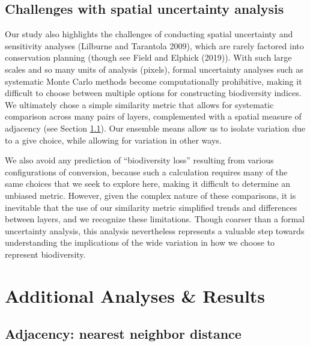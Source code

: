 \documentclass[
]{article}
\begin{document}
\hypertarget{challenges-with-spatial-uncertainty-analysis}{%
\subsection{Challenges with spatial uncertainty analysis}\label{challenges-with-spatial-uncertainty-analysis}}

Our study also highlights the challenges of conducting spatial uncertainty and sensitivity analyses (Lilburne and Tarantola 2009), which are rarely factored into conservation planning (though see Field and Elphick (2019)). With such large scales and so many units of analysis (pixels), formal uncertainty analyses such as systematic Monte Carlo methods become computationally prohibitive, making it difficult to choose between multiple options for constructing biodiversity indices. We ultimately chose a simple similarity metric that allows for systematic comparison across many pairs of layers, complemented with a spatial measure of adjacency (see Section \ref{section-adjacency}). Our ensemble means allow us to isolate variation due to a give choice, while allowing for variation in other ways.

We also avoid any prediction of ``biodiversity loss'' resulting from various configurations of conversion, because such a calculation requires many of the same choices that we seek to explore here, making it difficult to determine an unbiased metric. However, given the complex nature of these comparisons, it is inevitable that the use of our similarity metric simplified trends and differences between layers, and we recognize these limitations. Though coarser than a formal uncertainty analysis, this analysis nevertheless represents a valuable step towards understanding the implications of the wide variation in how we choose to represent biodiversity.

\hypertarget{robust}{%
\section{Additional Analyses \& Results}\label{robust}}

\hypertarget{section-adjacency}{%
\subsection{Adjacency: nearest neighbor distance}\label{section-adjacency}}
\end{document}

